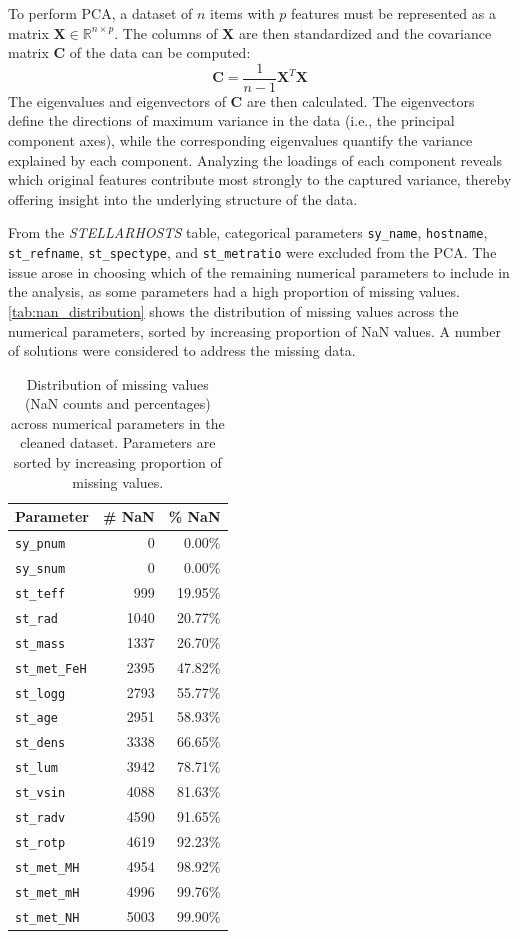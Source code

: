 \documentclass[preprint]{aastex631}
\begin{document}
To perform PCA, a dataset of $n$ items with $p$ features must be represented as a matrix $\mathbf{X} \in \mathbb{R}^{n \times p}$. The columns of $\mathbf{X}$ are then standardized and the covariance matrix $\mathbf{C}$ of the data can be computed:
\begin{equation}
  \mathbf{C} = \frac{1}{n-1} \mathbf{X}^T \mathbf{X}
\end{equation}
The eigenvalues and eigenvectors of $\mathbf{C}$ are then calculated. The eigenvectors define the directions of maximum variance in the data (i.e., the principal component axes), while the corresponding eigenvalues quantify the variance explained by each component. Analyzing the loadings of each component reveals which original features contribute most strongly to the captured variance, thereby offering insight into the underlying structure of the data.

From the \textit{STELLARHOSTS} table, categorical parameters \verb|sy_name|, \verb|hostname|, \verb|st_refname|, \verb|st_spectype|, and \verb|st_metratio| were excluded from the PCA. The issue arose in choosing which of the remaining numerical parameters to include in the analysis, as some parameters had a high proportion of missing values. \autoref{tab:nan_distribution} shows the distribution of missing values across the numerical parameters, sorted by increasing proportion of NaN values. A number of solutions were considered to address the missing data.
\begin{table}
  \centering
  \begin{tabular}{lrr}
    \hline
    \textbf{Parameter} & \textbf{\# NaN} & \textbf{\% NaN} \\
    \hline
    \verb|sy_pnum| & 0 & 0.00\% \\
    \verb|sy_snum| & 0 & 0.00\% \\
    \verb|st_teff| & 999 & 19.95\% \\
    \verb|st_rad| & 1040 & 20.77\% \\
    \verb|st_mass| & 1337 & 26.70\% \\
    \verb|st_met_FeH| & 2395 & 47.82\% \\
    \verb|st_logg| & 2793 & 55.77\% \\
    \verb|st_age| & 2951 & 58.93\% \\
    \verb|st_dens| & 3338 & 66.65\% \\
    \verb|st_lum| & 3942 & 78.71\% \\
    \verb|st_vsin| & 4088 & 81.63\% \\
    \verb|st_radv| & 4590 & 91.65\% \\
    \verb|st_rotp| & 4619 & 92.23\% \\
    \verb|st_met_MH| & 4954 & 98.92\% \\
    \verb|st_met_mH| & 4996 & 99.76\% \\
    \verb|st_met_NH| & 5003 & 99.90\% \\
    \hline
  \end{tabular}
  \caption{Distribution of missing values (NaN counts and percentages) across numerical parameters in the cleaned dataset. Parameters are sorted by increasing proportion of missing values.}
  \label{tab:nan_distribution}
\end{table}
\end{document}
